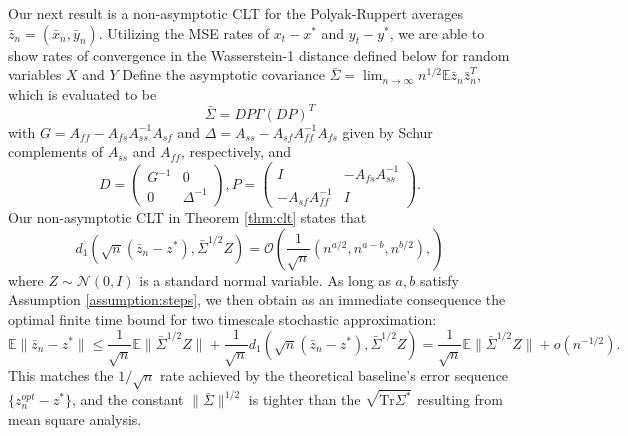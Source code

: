 Our next result is a non-asymptotic CLT for the Polyak-Ruppert averages $\bar{z}_n = (\bar{x}_n, \bar{y}_n)$.
Utilizing the MSE rates of $x_t - x^*$ and $y_t - y^*$, we are able to show rates of convergence in the Wasserstein-1 distance defined below for random variables $X$ and $Y$
\unskip
Define the asymptotic covariance $\bar{\Sigma} = \lim_{n \to \infty} n^{1/2} \mathbb{E} \bar{z}_n \bar{z}_n^T$, which is evaluated to be
\begin{equation}
    \bar{\Sigma} =  DP \Gamma (DP)^T
\end{equation}
with $G = A_{ff} - A_{fs} A_{ss}^{-1} A_{sf}$ and $\Delta = A_{ss} - A_{sf} A_{ff}^{-1} A_{fs}$ given by Schur complements of $A_{ss}$ and $A_{ff}$, respectively, and
\begin{equation} 
    D = \begin{pmatrix}
        G^{-1} & 0 \\ 0 & \Delta^{-1}
    \end{pmatrix}, 
    P = \begin{pmatrix}
        I & - A_{fs} A_{ss}^{-1}
        \\ 
        - A_{sf} A_{ff}^{-1} & I
    \end{pmatrix} .
\end{equation}    
Our non-asymptotic CLT in Theorem \ref{thm:clt} states that 
\begin{equation}\label{eq:WassersteinBound}
    d_1 \left(\sqrt{n}(\bar{z}_n - z^*), \bar{\Sigma}^{1/2} Z\right) = \mathcal{O}\left(
        \frac{1}{\sqrt{n}}\left(n^{a/2}, n^{a-b}, n^{b/2}\right) ,
    \right)
\end{equation}
where $Z \sim \mathcal{N}(0, I)$ is a standard normal variable.
As long as $a, b$ satisfy Assumption \ref{assumption:steps}, we then obtain as an immediate consequence the optimal finite time bound for two timescale stochastic approximation: 
\begin{equation}
    \mathbb{E}\lVert \bar{z}_n - z^* \rVert \leq \frac{1}{\sqrt{n}} \mathbb{E}\lVert \bar{\Sigma}^{1/2} Z \rVert + \frac{1}{\sqrt{n}} d_1 \left(\sqrt{n}(\bar{z}_n - z^*), \bar{\Sigma}^{1/2} Z \right) 
    = \frac{1}{\sqrt{n}} \mathbb{E} \lVert \bar{\Sigma}^{1/2} Z\rVert + o(n^{-1/2}) .
\end{equation}
This matches the $1/\sqrt{n}$ rate achieved by the theoretical baseline's error sequence $\{z^{opt}_n - z^*\}$, and the constant $\lVert \bar{\Sigma} \rVert^{1/2}$ is tighter than the $\sqrt{\mathrm{Tr} \Sigma^*}$ resulting from mean square analysis. 




